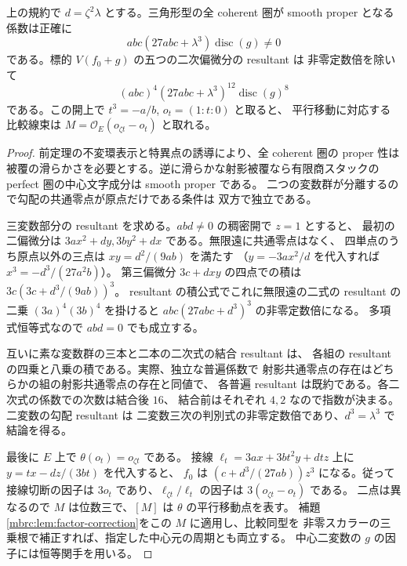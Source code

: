 \begin{corollary}[三角形型の係数判別と比較線束]\label{nqt:cor:triangle-audit}
上の規約で $d=\zeta^2\lambda$ とする。三角形型の全 coherent 圏が
smooth proper となる係数は正確に
\[
 abc(27abc+\lambda^3)\operatorname{disc}(g)\ne0
\]
である。標的 $V(f_0+g)$ の五つの二次偏微分の resultant は
非零定数倍を除いて
\[
 (abc)^4(27abc+\lambda^3)^{12}\operatorname{disc}(g)^8
\]
である。この開上で $t^3=-a/b$, $o_t=(1:t:0)$ と取ると、
平行移動に対応する比較線束は
$M=\mathcal O_E(o_{\zeta t}-o_t)$ と取れる。
\end{corollary}
\begin{proof}
前定理の不変環表示と特異点の誘導により、全 coherent 圏の proper 性は
被覆の滑らかさを必要とする。逆に滑らかな射影被覆なら有限商スタックの
perfect 圏の中心文字成分は smooth proper である。
二つの変数群が分離するので勾配の共通零点が原点だけである条件は
双方で独立である。

三変数部分の resultant を求める。$abd\ne0$ の稠密開で $z=1$ とすると、
最初の二偏微分は $3ax^2+dy,3by^2+dx$ である。無限遠に共通零点はなく、
四単点のうち原点以外の三点は $xy=d^2/(9ab)$ を満たす
（$y=-3ax^2/d$ を代入すれば $x^3=-d^3/(27a^2b)$）。
第三偏微分 $3c+dxy$ の四点での積は $3c(3c+d^3/(9ab))^3$。
resultant の積公式でこれに無限遠の二式の resultant の二乗
$(3a)^4(3b)^4$ を掛けると $abc(27abc+d^3)^3$ の非零定数倍になる。
多項式恒等式なので $abd=0$ でも成立する。

互いに素な変数群の三本と二本の二次式の結合 resultant は、
各組の resultant の四乗と八乗の積である。実際、独立な普遍係数で
射影共通零点の存在はどちらかの組の射影共通零点の存在と同値で、
各普遍 resultant は既約である。各二次式の係数での次数は結合後 $16$、
結合前はそれぞれ $4,2$ なので指数が決まる。二変数の勾配 resultant は
二変数三次の判別式の非零定数倍であり、$d^3=\lambda^3$ で結論を得る。

最後に $E$ 上で $\theta(o_t)=o_{\zeta t}$ である。
接線 $\ell_t=3ax+3bt^2y+dtz$ 上に $y=tx-dz/(3bt)$ を代入すると、
$f_0$ は $(c+d^3/(27ab))z^3$ になる。従って接線切断の因子は
$3o_t$ であり、$\ell_{\zeta t}/\ell_t$ の因子は $3(o_{\zeta t}-o_t)$ である。
二点は異なるので $M$ は位数三で、$[M]$ は $\theta$ の平行移動点を表す。
補題\ref{mbrc:lem:factor-correction}をこの $M$ に適用し、比較同型を
非零スカラーの三乗根で補正すれば、指定した中心元の周期とも両立する。
中心二変数の $g$ の因子には恒等関手を用いる。
\end{proof}

